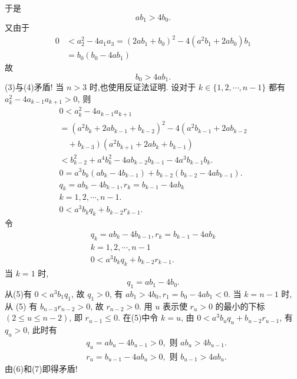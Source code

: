 于是
$$
a b_1>4 b_0 . \label{(3)}
$$
又由于
$$
\begin{aligned}
0 & <a_2^2-4 a_1 a_3=\left(2 a b_1+b_0\right)^2-4\left(a^2 b_1+2 a b_0\right) b_1 \\
& =b_0\left(b_0-4 a b_1\right)
\end{aligned}
$$
故
$$
b_0>4 a b_1 .   \label{(4)}
$$
(3)与(4)矛盾!
当 $n>3$ 时,也使用反证法证明.
设对于 $k \in\{1,2, \cdots, n-1\}$ 都有 $a_k^2-4 a_{k-1} a_{k+1}>0$, 则
$$
\begin{gathered}
0<a_k^2-4 a_{k-1} a_{k+1} \\
=\left(a^2 b_k+2 a b_{k-1}+b_{k-2}\right)^2-4\left(a^2 b_{k-1}+2 a b_{k-2}\right. \\
\left.\quad+b_{k-3}\right)\left(a^2 b_{k+1}+2 a b_k+b_{k-1}\right) \\
<b_{k-2}^2+a^4 b_k^2-4 a b_{k-2} b_{k-1}-4 a^3 b_{k-1} b_k . \\
0=a^3 b_k\left(a b_k-4 b_{k-1}\right)+b_{k-2}\left(b_{k-2}-4 a b_{k-1}\right) . \\
q_k=a b_k-4 b_{k-1}, r_k=b_{k-1}-4 a b_k \\
k=1,2, \cdots, n-1 . \\
0<a^3 b_k q_k+b_{k-2} r_{k-1} .
\end{gathered}
$$
令
$$
\begin{gathered}
q_k=a b_k-4 b_{k-1}, r_k=b_{k-1}-4 a b_k \\
k=1,2, \cdots, n-1 \\
0<a^3 b_k q_k+b_{k-2} r_{k-1} . \label{(5)}
\end{gathered}
$$
当 $k=1$ 时,
$$
q_1=a b_1-4 b_0 .
$$
从(5)有 $0<a^3 b_1 q_1$, 故 $q_1>0$, 有 $a b_1>4 b_0, r_1=b_0-4 a b_1<0$.
当 $k=n-1$ 时, 从 (5) 有 $b_{n-3} r_{n-2}>0$, 故 $r_{n-2}>0$.
用 $u$ 表示使 $r_u>0$ 的最小的下标 $(2 \leqslant u \leqslant n-2)$, 即 $r_{u-1} \leqslant 0$.
在(5)中令 $k=u$, 由 $0<a^3 b_u q_u+b_{u-2} r_{u-1}$, 有 $q_u>0$, 此时有
$$
\begin{aligned}
& q_u=a b_u-4 b_{u-1}>0, \text { 则 } a b_u>4 b_{u-1} . \label{(6)} \\
& r_u=b_{u-1}-4 a b_u>0, \text { 则 } b_{u-1}>4 a b_u . \label{(7)}
\end{aligned}
$$
由(6)和(7)即得矛盾!



